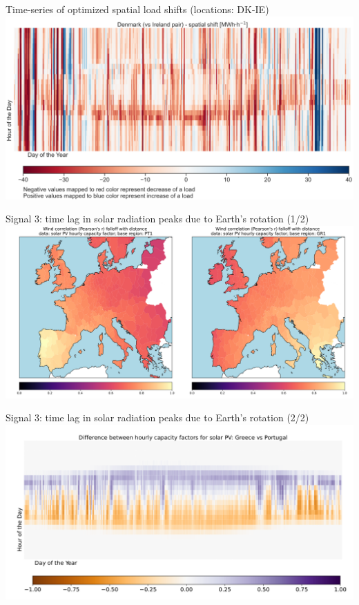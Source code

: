 \begin{frame}{Time-series of optimized spatial load shifts (locations: DK-IE)}
  \centering
  \vspace{0.3cm}
  \includegraphics[width=14cm]{images/results-6.png}
\end{frame}


\begin{frame}{Signal 3: time lag in solar radiation peaks due to Earth's rotation (1/2)}
  \centering
  \vspace{0.3cm}
  \includegraphics[width=14cm]{images/results-7.png}
\end{frame}


\begin{frame}{Signal 3: time lag in solar radiation peaks due to Earth's rotation (2/2)}
  \centering
  \vspace{0.3cm}
  \includegraphics[width=14cm]{images/results-8.png}
\end{frame}



